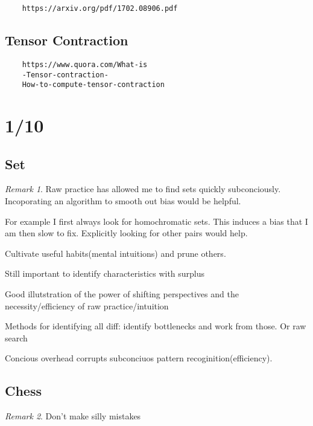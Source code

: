 \documentclass[11pt]{article}
\theoremstyle{remark}
\newtheorem{remark}{Remark}
\begin{document}
\begin{verbatim}
	https://arxiv.org/pdf/1702.08906.pdf
\end{verbatim}



\subsection{Tensor Contraction}

\begin{verbatim}
	https://www.quora.com/What-is
	-Tensor-contraction-
	How-to-compute-tensor-contraction
\end{verbatim}

\section{1/10}

\subsection{Set}

\begin{remark}
	Raw practice has allowed me to find sets quickly subconciously. Incoporating an algorithm to smooth out bias would be helpful.

	For example I first always look for homochromatic sets. This induces a bias that I am then slow to fix. Explicitly looking for other pairs would help.

	Cultivate useful habits(mental intuitions) and prune others.

	Still important to identify characteristics with surplus

	Good illutstration of the power of shifting perspectives and the necessity/efficiency of raw practice/intuition

	Methods for identifying all diff: identify bottlenecks and work from those. Or raw search

	Concious overhead corrupts subconciuos pattern recoginition(efficiency).
\end{remark}

\subsection{Chess}

\begin{remark}
	Don't make silly mistakes
\end{remark}
\end{document}
